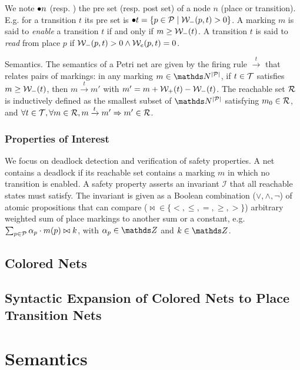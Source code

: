 \documentclass{llncs}
\begin{document}
We note $\bullet{n}$ (resp. ) the pre set (resp. post set) of a node $n$ (place or transition). E.g. for a transition $t$ its pre set is $\bullet{t}= \{ p \in \mathcal{P} \mid \mathcal{W}_-(p,t) > 0 \}$.  A marking $m$ is said to \textit{enable} a transition $t$ if and only if $m \geq \mathcal{W}_-(t)$. A transition $t$ is said to \emph{read} from place $p$ if $\mathcal{W}_-(p,t)>0 \land \mathcal{W}_e(p,t)=0$.

\vspace{-0.5em}
\begin{definition}
Semantics. The semantics of a Petri net are given by the firing rule $\xrightarrow{t}$ that relates pairs of markings: in any marking $m \in  \nat^{|\Places|}$, if $t \in \mathcal{T}$ satisfies $m \geq \mathcal{W}_-(t)$, then $m\xrightarrow{t}m'$ with $m' = m + \mathcal{W}_+(t) - \mathcal{W}_-(t)$. The reachable set $\mathcal{R}{}$ is inductively defined as the smallest subset of $\nat^{|\Places|}$ satisfying $m_0 \in \mathcal{R}$, and $\forall t \in \mathcal{T}{}, \forall m \in \mathcal{R}{}, m \xrightarrow{t} m' \Rightarrow m' \in \mathcal{R}$.
\end{definition}

\vspace{-1em}
\subsubsection{Properties of Interest}

We focus on deadlock detection and verification of safety properties. A net contains a deadlock if its reachable set contains a marking $m$ in which no transition is enabled.
A safety property asserts an invariant $\mathcal{I}$ that all reachable states must satisfy. The invariant is given as a Boolean combination ($\lor, \land, \lnot$) of atomic propositions that can compare ($\bowtie \in \{<, \leq, =, \geq, >\}$) arbitrary weighted sum of place markings to another sum or a constant, e.g. $\sum_{p \in \mathcal{P}} \alpha_p \cdot m(p) \bowtie k$, with $\alpha_p \in \zrel$ and $k \in \zrel$.


\subsection{Colored Nets}

\subsection{Syntactic Expansion of Colored Nets to Place Transition Nets}

\section{Semantics}
\end{document}
